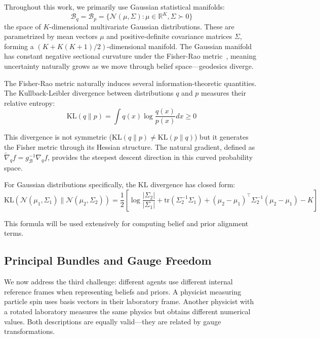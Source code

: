 \documentclass[11pt]{article}
\begin{document}
Throughout this work, we primarily use Gaussian statistical manifolds:
\begin{equation}
\mathcal{B}_q = \mathcal{B}_p = \{\mathcal{N}(\mu, \Sigma) : \mu \in \mathbb{R}^K, \Sigma \succ 0\}
\end{equation}
the space of $K$-dimensional multivariate Gaussian distributions. These are parametrized by mean vectors $\mu$ and positive-definite covariance matrices $\Sigma$, forming a $(K + K(K+1)/2)$-dimensional manifold. The Gaussian manifold has constant negative sectional curvature under the Fisher-Rao metric~\cite{Amari2016}, meaning uncertainty naturally grows as we move through belief space---geodesics diverge.

The Fisher-Rao metric naturally induces several information-theoretic quantities. The Kullback-Leibler divergence between distributions $q$ and $p$ measures their relative entropy:
\begin{equation}
\mathrm{KL}(q \| p) = \int q(x) \log\frac{q(x)}{p(x)} dx \geq 0
\end{equation}

This divergence is not symmetric ($\mathrm{KL}(q \| p) \neq \mathrm{KL}(p \| q)$) but it generates the Fisher metric through its Hessian structure. The natural gradient, defined as $\tilde{\nabla}_q f = g^{-1}_{\mathcal{B}} \nabla_q f$, provides the steepest descent direction in this curved probability space.

For Gaussian distributions specifically, the KL divergence has closed form:
\begin{equation}
\mathrm{KL}(\mathcal{N}(\mu_1, \Sigma_1) \| \mathcal{N}(\mu_2, \Sigma_2)) = \frac{1}{2}\left[\log\frac{|\Sigma_2|}{|\Sigma_1|} + \mathrm{tr}(\Sigma_2^{-1}\Sigma_1) + (\mu_2 - \mu_1)^\top\Sigma_2^{-1}(\mu_2 - \mu_1) - K\right]
\label{eq:kl_gaussian}
\end{equation}

This formula will be used extensively for computing belief and prior alignment terms.

\subsection{Principal Bundles and Gauge Freedom}

We now address the third challenge: different agents use different internal reference frames when representing beliefs and priors. A physicist measuring particle spin uses basis vectors in their laboratory frame. Another physicist with a rotated laboratory measures the same physics but obtains different numerical values. Both descriptions are equally valid---they are related by gauge transformations.
\end{document}
